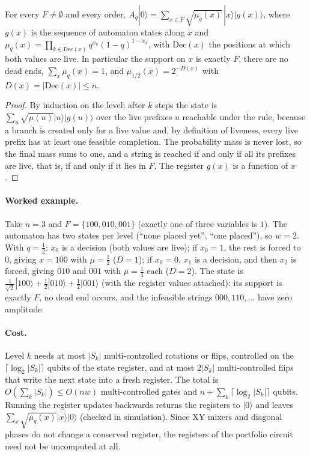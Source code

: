 \begin{theorem}\label{thm:universal}
For every $F\neq\emptyset$ and every order, $A_q|0\rangle=\sum_{x\in F}\sqrt{\mu_q(x)}\,|x\rangle|g(x)\rangle$, where $g(x)$ is the sequence of automaton states along $x$ and $\mu_q(x)=\prod_{k\in\mathrm{Dec}(x)}q^{x_k}(1-q)^{1-x_k}$, with $\mathrm{Dec}(x)$ the positions at which both values are live. In particular the support on $x$ is exactly $F$, there are no dead ends, $\sum_x\mu_q(x)=1$, and $\mu_{1/2}(x)=2^{-D(x)}$ with $D(x)=|\mathrm{Dec}(x)|\le n$.
\end{theorem}
\begin{proof}
By induction on the level: after $k$ steps the state is $\sum_u\sqrt{\mu(u)}|u\rangle|g(u)\rangle$ over the live prefixes $u$ reachable under the rule, because a branch is created only for a live value and, by definition of liveness, every live prefix has at least one feasible completion. The probability mass is never lost, so the final mass sums to one, and a string is reached if and only if all its prefixes are live, that is, if and only if it lies in $F$. The register $g(x)$ is a function of $x$.
\end{proof}
\paragraph{Worked example.} Take $n=3$ and $F=\{100,010,001\}$ (exactly one of three variables is $1$). The automaton has two states per level (``none placed yet'', ``one placed''), so $w=2$. With $q=\tfrac12$: $x_0$ is a decision (both values are live); if $x_0=1$, the rest is forced to $0$, giving $x=100$ with $\mu=\tfrac12$ ($D=1$); if $x_0=0$, $x_1$ is a decision, and then $x_2$ is forced, giving $010$ and $001$ with $\mu=\tfrac14$ each ($D=2$). The state is $\tfrac1{\sqrt2}|100\rangle+\tfrac12|010\rangle+\tfrac12|001\rangle$ (with the register values attached): its support is exactly $F$, no dead end occurs, and the infeasible strings $000,110,\dots$ have zero amplitude.

\paragraph{Cost.} Level $k$ needs at most $|S_k|$ multi-controlled rotations or flips, controlled on the $\lceil\log_2|S_k|\rceil$ qubits of the state register, and at most $2|S_k|$ multi-controlled flips that write the next state into a fresh register. The total is $O(\sum_k|S_k|)\le O(nw)$ multi-controlled gates and $n+\sum_k\lceil\log_2|S_k|\rceil$ qubits. Running the register updates backwards returns the registers to $|0\rangle$ and leaves $\sum_x\sqrt{\mu_q(x)}|x\rangle|0\rangle$ (checked in simulation). Since XY mixers and diagonal phases do not change a conserved register, the registers of the portfolio circuit need not be uncomputed at all.

